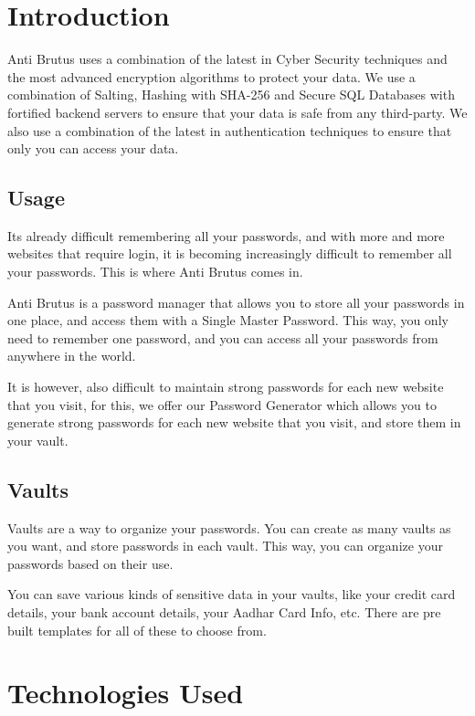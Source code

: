 \documentclass[11pt]{article}
\begin{document}
\tableofcontents
\thispagestyle{empty}
\clearpage

\setcounter{page}{1}

\section{Introduction}
Anti Brutus uses a combination of the latest in Cyber Security techniques and the most advanced encryption algorithms to protect your data. We use a combination of Salting, Hashing with SHA-256 and Secure SQL Databases with fortified backend servers to ensure that your data is safe from any third-party. We also use a combination of the latest in authentication techniques to ensure that only you can access your data.

\subsection{Usage}

Its already difficult remembering all your passwords, and with more and more websites that require login, it is becoming increasingly difficult to remember all your passwords. This is where Anti Brutus comes in.

Anti Brutus is a password manager that allows you to store all your passwords in one place, and access them with a Single Master Password. This way, you only need to remember one password, and you can access all your passwords from anywhere in the world.

It is however, also difficult to maintain strong passwords for each new website that you visit, for this, we offer our Password Generator which allows you to generate strong passwords for each new website that you visit, and store them in your vault.

\subsection{Vaults}

Vaults are a way to organize your passwords. You can create as many vaults as you want, and store passwords in each vault. This way, you can organize your passwords based on their use.

You can save various kinds of sensitive data in your vaults, like your credit card details, your bank account details, your Aadhar Card Info, etc. There are pre built templates for all of these to choose from.

\section{Technologies Used}
\end{document}
